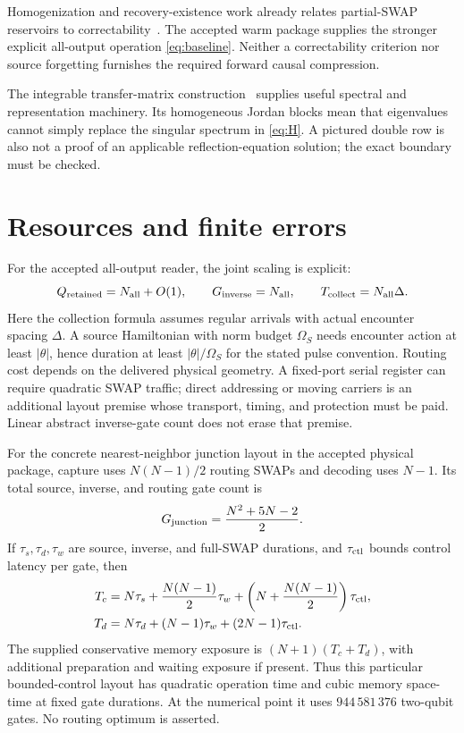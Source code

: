\documentclass[11pt]{article}
\begin{document}
Homogenization and recovery-existence work already relates partial-SWAP
reservoirs to correctability~\cite{yosifov}. The accepted warm package supplies
the stronger explicit all-output operation \eqref{eq:baseline}. Neither a
correctability criterion nor source forgetting furnishes the required
forward causal compression.

The integrable transfer-matrix construction~\cite{claeys} supplies useful
spectral and representation machinery. Its homogeneous Jordan blocks mean
that eigenvalues cannot simply replace the singular spectrum in
\eqref{eq:H}. A pictured double row is also not a proof of an applicable
reflection-equation solution; the exact boundary must be checked.

\section{Resources and finite errors}

For the accepted all-output reader, the joint scaling is explicit:
\[
 Q_{\rm retained}=N_{\rm all}+O(1),\qquad
 G_{\rm inverse}=N_{\rm all},\qquad
 T_{\rm collect}=N_{\rm all}\Delta.
\]
Here the collection formula assumes regular arrivals with actual encounter
spacing $\Delta$. A source Hamiltonian
with norm budget $\Omega_S$ needs encounter action at least $|\theta|$, hence
duration at least $|\theta|/\Omega_S$ for the stated pulse convention.
Routing cost depends on the delivered physical geometry. A fixed-port serial
register can require quadratic SWAP traffic; direct addressing or moving
carriers is an additional layout premise whose transport, timing, and
protection must be paid. Linear abstract inverse-gate count does not erase
that premise.

For the concrete nearest-neighbor junction layout in the accepted physical
package, capture uses $N(N-1)/2$ routing SWAPs and decoding uses $N-1$.
Its total source, inverse, and routing gate count is
\[
 G_{\rm junction}=\frac{N^2+5N-2}{2}.
\]
If $\tau_s,\tau_d,\tau_w$ are source, inverse, and full-SWAP durations,
and $\tau_{\rm ctl}$ bounds control latency per gate, then
\begin{align*}
 T_c&=N\tau_s+\frac{N(N-1)}2\tau_w
             +\left(N+\frac{N(N-1)}2\right)\tau_{\rm ctl},\\
 T_d&=N\tau_d+(N-1)\tau_w+(2N-1)\tau_{\rm ctl}.
\end{align*}
The supplied conservative memory exposure is
$(N+1)(T_c+T_d)$, with additional preparation and waiting exposure if present.
Thus this particular bounded-control layout has quadratic operation time and
cubic memory space-time at fixed gate durations. At the numerical point it
uses $944\,581\,376$ two-qubit gates. No routing optimum is asserted.
\end{document}
